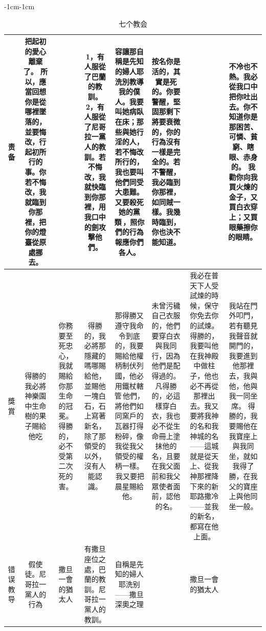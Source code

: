 \begin{changemargin}{-1cm}{-1cm}
\begin{table}
\begin{tabular}{cccccccc}
\multicolumn{1}{m{.3cm}|}{责备}&
\multicolumn{1}{m{3cm}|}{把起初的愛心離棄了。 所以，應當回想你是從哪裡墜落的，並要悔改，行起初所行的事。你若不悔改，我就臨到你那裡，把你的燈臺從原處挪去。 }  &
\multicolumn{1}{m{3cm}|}{}  &
 \multicolumn{1}{m{3cm}|}{1，有人服從了巴蘭的教訓。2，有人服從了尼哥拉一黨人的教訓。若不悔改，我就快臨到你那裡，用我口中的劍攻擊他們。} &
 \multicolumn{1}{m{4cm}|}{容讓那自稱是先知的婦人耶洗別教導我的僕人。我要叫她病臥在床；那些與她行淫的人，若不悔改所行的，我也要叫他們同受大患難。又要殺死她的黨類 ，照你們的行為報應你們各人。}  &
 \multicolumn{1}{m{3cm}|}{按名你是活的，其實是死的。你要警醒，堅固那剩下將要衰微的，你的行為沒有一樣是完全的。若不警醒，我必臨到你那裡，如同賊一樣。我幾時臨到，你也決不能知道。}   &
 \multicolumn{1}{m{3.6cm}|}{}  &  
 \multicolumn{1}{m{3cm}|}{不冷也不熱。我必從我口中把你吐出去。你不知道你是那困苦、可憐、貧窮、瞎眼、赤身的。 我勸你向我買火煉的金子，又買白衣穿上；又買眼藥擦你的眼睛。 } \\\hline
 
 


\multicolumn{1}{m{.3cm}|}{獎賞}&
\multicolumn{1}{m{3cm}|}{得勝的我必將神樂園中生命樹的果子賜給他吃}  &
 \multicolumn{1}{m{3cm}|}{你務要至死忠心，我就賜給你那生命的冠冕。得勝的，必不受第二次死的害。} &
 \multicolumn{1}{m{3cm}|}{得勝的，我必將那隱藏的嗎哪賜給他，並賜他一塊白石，石上寫著新名，除了那領受的以外，沒有人能認識。 } & 
  \multicolumn{1}{m{4cm}|}{那得勝又遵守我命令到底的，我要賜給他權柄制伏列國，他必用鐵杖轄管 他們，將他們如同窯戶的瓦器打得粉碎，像我從我父領受的權柄一樣。  我又要把晨星賜給他。 }& 
   \multicolumn{1}{m{3cm}|}{未曾污穢自己衣服的，他們要穿白衣與我同行，因為他們是配得過的。 凡得勝的，必這樣穿白衣，我也必不從生命冊上塗抹他的名，且要在我父面前和我父眾使者面前，認他的名。 } & 
    \multicolumn{1}{m{3.6cm}|}{我必在普天下人受試煉的時候，保守你免去你的試煉。得勝的，我要叫他在我神殿中做柱子，他也必不再從那裡出去。我又要將我神的名和我神城的名——這城就是從天上、從我神那裡降下來的新耶路撒冷——並我的新名，都寫在他上面。 } &
     \multicolumn{1}{m{3cm}|}{我站在門外叩門，若有聽見我聲音就開門的，我要進到他那裡去，我與他，他與我一同坐席。 得勝的，我要賜他在我寶座上與我同坐，就如我得了勝，在我父的寶座上與他同坐一般。} \\\hline
     
  \multicolumn{1}{m{.3cm}|}{错误教导}&
\multicolumn{1}{m{3cm}|}{假使徒。尼哥拉一黨人的行為}  &
\multicolumn{1}{m{3cm}|}{撒旦一會的猶太人}  &
 \multicolumn{1}{m{3cm}|}{有撒旦座位之處，巴蘭的教訓。尼哥拉一黨人的教訓。} &
 \multicolumn{1}{m{4cm}|}{自稱是先知的婦人耶洗别——撒旦深奧之理}  &
 \multicolumn{1}{m{3cm}|}{}   &
 \multicolumn{1}{m{3.6cm}|}{撒旦一會的猶太人}  &  
 \multicolumn{1}{m{3cm}|}{ } \\\hline
    
     
\end{tabular}
\caption{七个教会}
\end{table} 
\end{changemargin}
\fi

